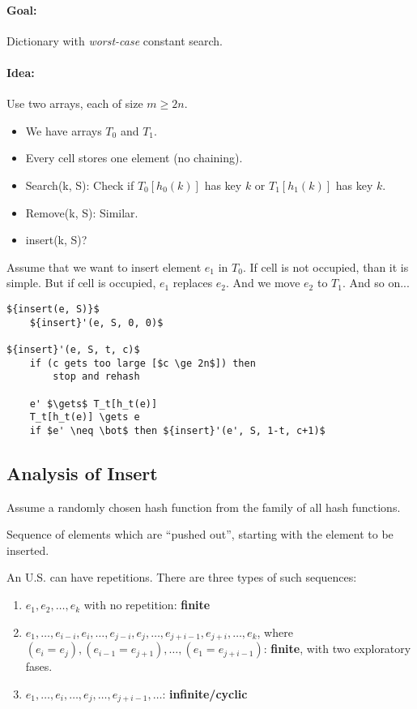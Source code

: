 \paragraph{Goal:} Dictionary with \emph{worst-case} constant search.

\paragraph{Idea:} Use two arrays, each of size $m \ge 2n$.

\begin{itemize}
\item We have arrays $T_0$ and $T_1$.
\item Every cell stores one element (no chaining).
\item Search(k, S): Check if $T_0[h_0(k)]$ has key $k$ or $T_1[h_1(k)]$ has key $k$.
\item Remove(k, S): Similar.
\item insert(k, S)?
\end{itemize}

Assume that we want to insert element $e_1$ in $T_0$. If cell is not occupied, than it is simple. But if cell is occupied, $e_1$ replaces $e_2$. And we move $e_2$ to $T_1$. And so on...

\newpage
\begin{lstlisting}[mathescape]
${insert(e, S)}$
    ${insert}'(e, S, 0, 0)$
    
${insert}'(e, S, t, c)$
    if (c gets too large [$c \ge 2n$]) then
        stop and rehash

    e' $\gets$ T_t[h_t(e)]
    T_t[h_t(e)] \gets e
    if $e' \neq \bot$ then ${insert}'(e', S, 1-t, c+1)$
\end{lstlisting}

\subsection{Analysis of Insert}

Assume a randomly chosen hash function from the family of all hash functions.

\begin{mydefinition}
Sequence of elements which are ``pushed out'', starting with the element to be inserted.
\end{mydefinition}

An U.S. can have repetitions. There are three types of such sequences:
\begin{enumerate}
\item $e_1, e_2, \ldots, e_k$ with no repetition: \textbf{finite}
\item $e_1, \ldots, e_{i-i}, e_i, \ldots, e_{j-i}, e_j, \ldots, e_{j+i-1}, e_{j+i}, \ldots, e_k$, where $(e_i = e_j), (e_{i-1} = e_{j+1}), \ldots, (e_1 = e_{j+i-1})$: \textbf{finite}, with two exploratory fases.
\item $e_1, \ldots, e_{i}, \ldots, e_j, \ldots, e_{j+i-1}, \ldots$: \textbf{infinite/cyclic}
\end{enumerate}

